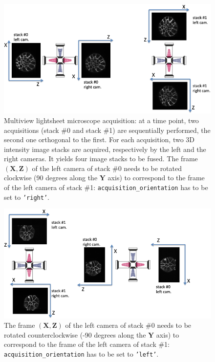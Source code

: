 \begin{figure}
\begin{center}
\includegraphics[width=150mm]{figures/acquisition-spim-right.png}
\end{center}
\caption{\label{fig:cli:fuse:spim:right:acquisition} Multiview lightsheet microscope acquisition: at a time point, two acquisitions (stack \#0 and stack \#1) are sequentially performed, the second one orthogonal to the first. For each acquisition, two 3D intensity image stacks are acquired, respectively by the left and the right cameras. 
It yields four image stacks to be fused. 
The frame $(\mathbf{X}, \mathbf{Z})$ of the left camera of stack \#0 needs to be rotated clockwise (90 degrees along the $\mathbf{Y}$ axis) to correspond to the frame of the left camera of stack \#1: \texttt{acquisition\_orientation} has to be set to \texttt{'right'}.}
\end{figure}

\begin{figure}
\begin{center}
\includegraphics[width=150mm]{figures/acquisition-spim-left.png}
\end{center}
\caption{\label{fig:cli:fuse:spim:left:acquisition} The frame $(\mathbf{X}, \mathbf{Z})$ of the left camera of stack \#0 needs to be rotated counterclockwise (-90 degrees along the $\mathbf{Y}$ axis) to correspond to the frame of the left camera of stack \#1: \texttt{acquisition\_orientation} has to be set to \texttt{'left'}.}
\end{figure}



